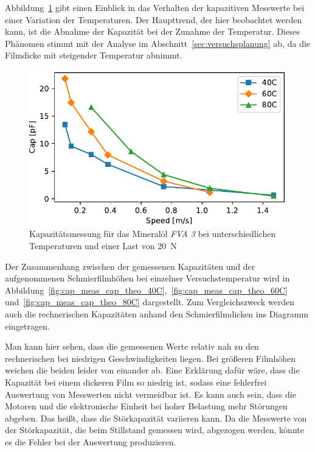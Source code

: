 Abbildung~\ref{fig:cap_vs_speed_dif_temp_meas} gibt einen Einblick in das Verhalten der kapazitiven Messwerte bei einer Variation der Temperaturen.
Der Haupttrend, der hier beobachtet werden kann, ist die Abnahme der Kapazität bei der Zunahme der Temperatur.
Dieses Phänomen stimmt mit der Analyse im Abschnitt~\ref{sec:versuchsplanung} ab, da die Filmdicke mit steigender Temperatur abnimmt.

\begin{figure}[htb]
    \centering
    \includegraphics[]{./images/cap_vs_speed_dif_temp_meas.pdf}
    \caption{Kapazitätsmessung für das Mineralöl \textit{FVA 3} bei unterschiedlichen Temperaturen und einer Last von \SI{20}{\N}}
    \label{fig:cap_vs_speed_dif_temp_meas}
\end{figure}

Der Zusammenhang zwischen der gemessenen Kapazitäten und der aufgenommenen Schmierfilmhöhen bei einzelner Versuchstemperatur wird in Abbildung~\ref{fig:cap_meas_cap_theo_40C},~\ref{fig:cap_meas_cap_theo_60C} und~\ref{fig:cap_meas_cap_theo_80C} dargestellt.
Zum Vergleichszweck werden auch die rechnerischen Kapazitäten anhand den Schmierfilmdicken ins Diagramm eingetragen.

Man kann hier sehen, dass die gemessenen Werte relativ nah zu den rechnerischen bei niedrigen Geschwindigkeiten liegen.
Bei größeren Filmhöhen weichen die beiden leider von einander ab.
Eine Erklärung dafür wäre, dass die Kapazität bei einem dickeren Film so niedrig ist, sodass eine fehlerfrei Auswertung von Messwerten nicht vermeidbar ist.
Es kann auch sein, dass die Motoren und die elektronische Einheit bei hoher Belastung mehr Störungen abgeben.
Das heißt, dass die Störkapazität variieren kann.
Da die Messwerte von der Störkapazität, die beim Stillstand gemessen wird, abgezogen werden, könnte es die Fehler bei der Auswertung produzieren.

